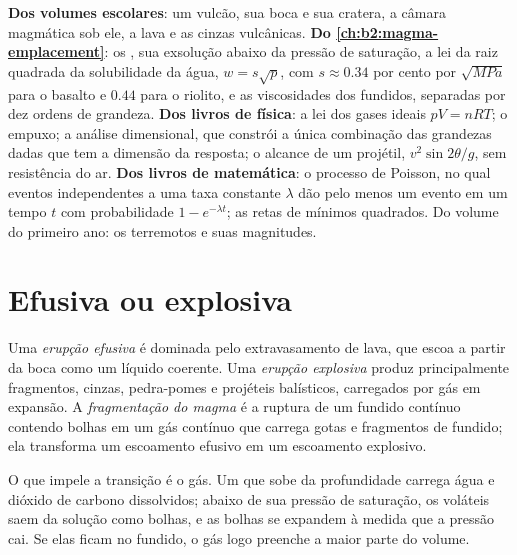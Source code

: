 \begin{recall}
\textbf{Dos volumes escolares}: um vulcão, sua boca e sua cratera, a câmara
magmática sob ele, a lava e as cinzas vulcânicas. \textbf{Do
\cref{ch:b2:magma-emplacement}}: os , sua exsolução abaixo da
pressão de saturação, a lei da raiz quadrada da solubilidade da água, $w = s\sqrt p$, com
$s \approx 0.34$ por cento por $\sqrt{\unit{MPa}}$ para o basalto e $0.44$ para o
riolito, e as viscosidades dos fundidos, separadas por dez ordens de grandeza.
\textbf{Dos livros de física}: a lei dos gases ideais $pV = nRT$; o empuxo;
a análise dimensional, que constrói a única combinação das grandezas dadas
que tem a dimensão da resposta; o alcance de um projétil, $v^2\sin 2\theta/g$,
sem resistência do ar. \textbf{Dos livros de matemática}: o processo de Poisson,
no qual eventos independentes a uma taxa constante $\lambda$ dão pelo menos um evento
em um tempo $t$ com probabilidade $1 - e^{-\lambda t}$; as retas de mínimos quadrados.
Do volume do primeiro ano: os terremotos e suas magnitudes.
\end{recall}

\section{Efusiva ou explosiva}

\begin{definition}\label{def:b2:eruptive-styles:regimes}
Uma \emph{erupção efusiva} é dominada pelo
extravasamento de lava, que escoa a partir da boca como um líquido coerente. Uma
\emph{erupção explosiva} produz principalmente fragmentos,
cinzas, pedra-pomes e projéteis balísticos, carregados por gás em expansão. A \emph{fragmentação
do magma} é a ruptura de um fundido contínuo
contendo bolhas em um gás contínuo que carrega gotas e fragmentos de fundido;
ela transforma um escoamento efusivo em um escoamento explosivo.
\end{definition}

O que impele a transição é o gás. Um  que sobe da profundidade carrega
água e dióxido de carbono dissolvidos; abaixo de sua pressão de saturação, os voláteis
saem da solução como bolhas, e as bolhas se expandem à medida que a pressão cai.
Se elas ficam no fundido, o gás logo preenche a maior parte do volume.

